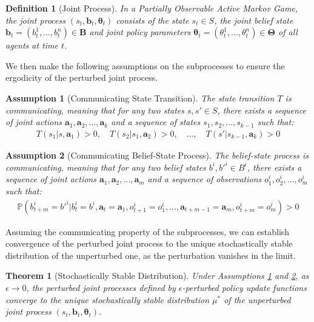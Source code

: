 \documentclass[a4paper,12pt]{report}
\newtheorem{theorem}{Theorem}
\newtheorem{definition}{Definition}
\newtheorem{assumption}{Assumption}
\begin{document}
\begin{definition}[Joint Process]
    In a Partially Observable Active Markov Game, the joint process $(s_t, \boldsymbol{b}_t, \boldsymbol{\theta}_t)$ consists of the state $s_t \in S$, the joint belief state $\boldsymbol{b}_t = (b^1_t, \ldots, b^n_t) \in \boldsymbol{B}$ and joint policy parameters $\boldsymbol{\theta}_t = (\theta^1_t, \ldots, \theta^n_t) \in \boldsymbol{\Theta}$ of all agents at time $t$.
\end{definition}
We then make the following assumptions on the subprocesses to ensure the ergodicity of the perturbed joint process.
\begin{assumption}[Communicating State Transition]\label{assumption:1}
    The state transition $T$ is communicating, meaning that for any two states $s, s' \in S$, there exists a sequence of joint actions $\boldsymbol{a}_1, \boldsymbol{a}_2, \ldots, \boldsymbol{a}_k$ and a sequence of states $s_1, s_2, \ldots, s_{k-1}$ such that:
    \begin{align}
        T(s_1|s, \boldsymbol{a}_1) > 0, \quad T(s_2|s_1, \boldsymbol{a}_2) > 0, \quad \ldots, \quad T(s'|s_{k-1}, \boldsymbol{a}_k) > 0
    \end{align}
\end{assumption}

\begin{assumption}[Communicating Belief-State Process]\label{assumption:2}
    The belief-state process is communicating, meaning that for any two belief states $b^i, b'^i \in B^i$, there exists a sequence of joint actions $\boldsymbol{a}_1, \boldsymbol{a}_2, \ldots, \boldsymbol{a}_m$ and a sequence of observations $o^i_1, o^i_2, \ldots, o^i_m$ such that:
    \begin{align}
        \mathbb{P}(b^i_{t+m} = b'^i | b^i_t = b^i, \boldsymbol{a}_t = \boldsymbol{a}_1, o^i_{t+1} = o^i_1, \ldots, \boldsymbol{a}_{t+m-1} = \boldsymbol{a}_m, o^i_{t+m} = o^i_m) > 0
    \end{align}
\end{assumption}
Assuming the communicating property of the subprocesses, we can establish convergence of the perturbed joint process to the unique stochastically stable distribution of the unperturbed one, as the perturbation vanishes in the limit.
\begin{theorem}[Stochastically Stable Distribution]
    Under Assumptions \ref{assumption:1} and \ref{assumption:2}, as $\epsilon \to 0$, the perturbed joint processes defined by $\epsilon$-perturbed policy update functions converge to the unique stochastically stable distribution $\mu^*$ of the unperturbed joint process $(s_t, \boldsymbol{b}_t, \boldsymbol{\theta}_t)$.
\end{theorem}
\end{document}
